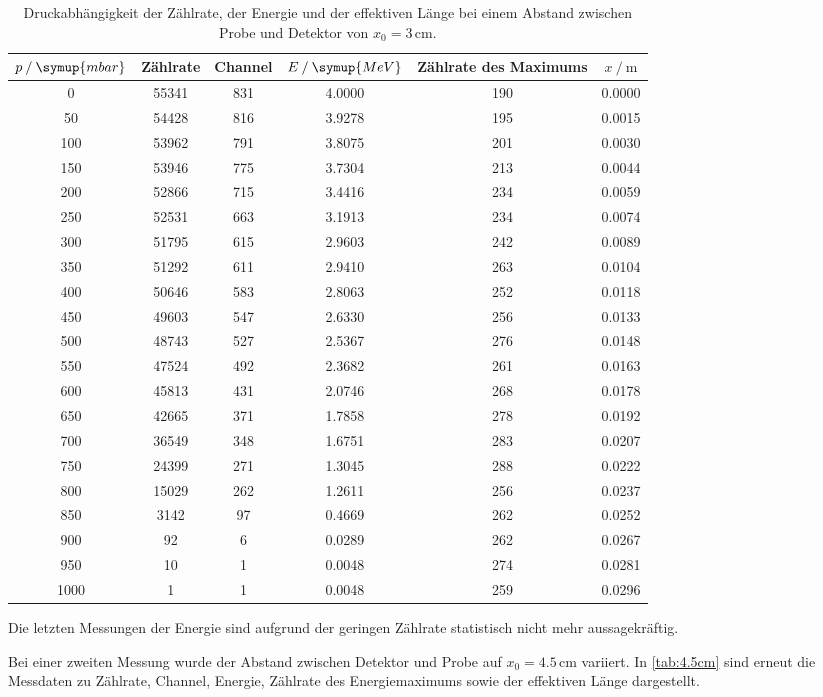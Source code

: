 \begin{table}
    \centering
    \caption{Druckabhängigkeit der Zählrate, der Energie und der effektiven Länge bei einem Abstand zwischen Probe und Detektor von $x_0 = 3\,\unit{\cm}$.}
\begin{tabular}{c c c c c c}
    \toprule
    $p \mathbin{/}\symup{mbar}$ &Zählrate& Channel & $E \mathbin{/}\symup{MeV}$ & Zählrate des Maximums & $x \mathbin{/}\unit{\m}$ \\
    \midrule
    0&55341&831&4.0000&190&0.0000 \\
    50&54428&816&3.9278&195&0.0015 \\
    100&53962&791&3.8075&201&0.0030\\
    150&53946&775&3.7304&213&0.0044\\
    200&52866&715&3.4416&234&0.0059\\
    250&52531&663&3.1913&234&0.0074\\
    300&51795&615&2.9603&242&0.0089\\
    350&51292&611&2.9410&263&0.0104\\
    400&50646&583&2.8063&252&0.0118\\
    450&49603&547&2.6330&256&0.0133\\
    500&48743&527&2.5367&276&0.0148\\
    550&47524&492&2.3682&261&0.0163\\
    600&45813&431&2.0746&268&0.0178\\
    650&42665&371&1.7858&278&0.0192\\
    700&36549&348&1.6751&283&0.0207\\
    750&24399&271&1.3045&288&0.0222\\
    800&15029&262&1.2611&256&0.0237\\
    850&3142&97&0.4669&262&0.0252\\
    900&92&6&0.0289&262&0.0267\\
    950&10&1&0.0048&274&0.0281\\
    1000&1&1&0.0048&259&0.0296\\
    \bottomrule
    \end{tabular}
    \label{tab:3cm}
\end{table}

Die letzten Messungen der Energie sind aufgrund der geringen Zählrate statistisch nicht mehr aussagekräftig.






Bei einer zweiten Messung wurde der Abstand zwischen Detektor und Probe auf $x_0 = 4.5 \,\unit{\cm}$ variiert. In \autoref{tab:4.5cm} sind erneut die 
Messdaten zu Zählrate, Channel, Energie, Zählrate des Energiemaximums sowie der effektiven Länge dargestellt.

